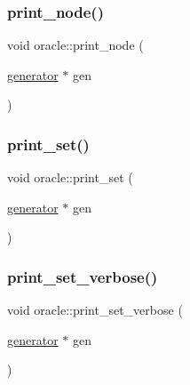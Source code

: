 \mbox{\label{classoracle_a8df91a7021b0e44a5c535515aa9c2062}} 
\subsubsection{\texorpdfstring{print\+\_\+node()}{print\_node()}}
{\footnotesize\ttfamily void oracle\+::print\+\_\+node (\begin{DoxyParamCaption}\item[{\mbox{\hyperlink{classgenerator}{generator}} $\ast$}]{gen }\end{DoxyParamCaption})}

\mbox{\label{classoracle_ad61bc9aa21c6a21da3845c83450faedc}} 
\subsubsection{\texorpdfstring{print\+\_\+set()}{print\_set()}}
{\footnotesize\ttfamily void oracle\+::print\+\_\+set (\begin{DoxyParamCaption}\item[{\mbox{\hyperlink{classgenerator}{generator}} $\ast$}]{gen }\end{DoxyParamCaption})}

\mbox{\label{classoracle_ab0456da7b7a451650ca11f21b648a091}} 
\subsubsection{\texorpdfstring{print\+\_\+set\+\_\+verbose()}{print\_set\_verbose()}}
{\footnotesize\ttfamily void oracle\+::print\+\_\+set\+\_\+verbose (\begin{DoxyParamCaption}\item[{\mbox{\hyperlink{classgenerator}{generator}} $\ast$}]{gen }\end{DoxyParamCaption})}

\mbox{\label{classoracle_a6ef0491640af9cf3c35de29cfcfb23ec}} 
